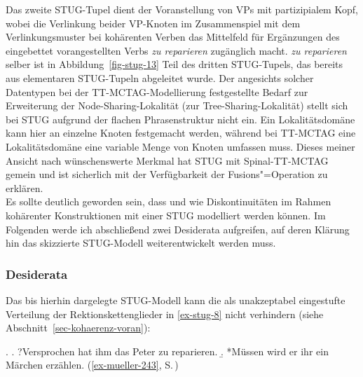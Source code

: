 Das zweite STUG-Tupel dient der Voranstellung von VPs mit partizipialem Kopf, wobei die Verlinkung beider VP-Knoten im Zusammenspiel mit dem Verlinkungsmuster bei kohärenten Verben das Mittelfeld für Ergänzungen des eingebettet vorangestellten Verbs {\it zu reparieren} zugänglich macht. {\it zu reparieren} selber ist in Abbildung~\ref{fig-stug-13} Teil des dritten STUG-Tupels, das bereits aus elementaren STUG-Tupeln abgeleitet wurde. Der angesichts solcher Datentypen bei der TT-MCTAG-Modellierung festgestellte Bedarf zur Erweiterung der Node-Sharing-Lokalität (zur Tree-Sharing-Lokalität) stellt sich bei STUG aufgrund der flachen Phrasenstruktur nicht ein. Ein Lokalitätsdomäne kann hier an einzelne Knoten festgemacht werden, während bei TT-MCTAG eine Lokalitätsdomäne eine variable Menge von Knoten umfassen muss. Dieses meiner Ansicht nach wünschenswerte Merkmal hat STUG mit Spinal-TT-MCTAG gemein und ist sicherlich mit der Verfügbarkeit der Fusions"=Operation zu erklären.\\ 

Es sollte deutlich geworden sein, dass und wie Diskontinuitäten im Rahmen kohärenter Konstruktionen mit einer STUG modelliert werden können. Im Folgenden werde ich abschlie\ss end zwei Desiderata aufgreifen, auf deren Klärung hin das skizzierte STUG-Modell weiterentwickelt werden muss.

\subsubsection*{Desiderata}

Das bis hierhin dargelegte STUG-Modell kann die als unakzeptabel eingestufte Verteilung der Rektionskettenglieder in \ref{ex-stug-8} nicht verhindern (siehe Abschnitt~\ref{sec-kohaerenz-voran}):

\ex. \label{ex-stug-8}
\a. ?Versprochen hat ihm das Peter zu reparieren.\label{ex-stug-8-a}
\b. *Müssen wird er ihr ein Märchen erzählen. \hfill (\ref{ex-mueller-243}, S.\,\pageref{ex-mueller-243})\label{ex-stug-8-b}

